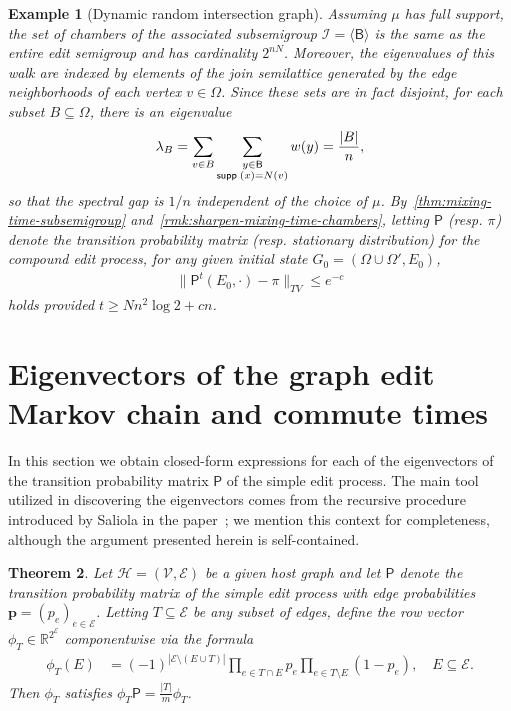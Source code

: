 \documentclass[11pt,a4paper]{article}
\newcommand{\supp}{{\mathsf{supp }\hspace{.075cm}}}
\newtheorem{theorem}{Theorem}[section]
\newtheorem{example}[theorem]{Example}
\begin{document}
\begin{example}[Dynamic random intersection graph]
    Assuming $\mu$ has full support, the set of chambers of the associated subsemigroup $\mathcal{I} = \langle \mathsf{B}\rangle$ is the same as the entire edit semigroup and has cardinality $2^{nN}$. Moreover, the eigenvalues of this walk are indexed by elements of the join semilattice generated by the edge neighborhoods of each vertex $v\in\Omega$. Since these sets are in fact disjoint, for each subset $B\subseteq \Omega$, there is an eigenvalue
        \begin{align*}
            \lambda_B = \sum_{v\in B} \sum_{\substack{y\in\mathsf{B} \\ \supp(x) = N(v)}} w(y) = \frac{|B|}{n},
        \end{align*}
    so that the spectral gap is $1/n$ independent of the choice of $\mu$. By~\cref{thm:mixing-time-subsemigroup} and~\cref{rmk:sharpen-mixing-time-chambers}, letting $\mathsf{P}$ (resp. $\pi$) denote the transition probability matrix (resp. stationary distribution) for the compound edit process, for any given initial state $G_0 = (\Omega\cup\Omega', E_0)$,
        \begin{align*}
            \|\mathsf{P}^t(E_0, \cdot) - \pi\|_{TV}\leq e^{-c}
        \end{align*}
    holds provided $t\geq Nn^2\log{2} + cn$.
\end{example}

\section{Eigenvectors of the graph edit Markov chain and commute times}\label{sec:eigenvectors}

In this section we obtain closed-form expressions for each of the eigenvectors of the transition probability matrix $\mathsf{P}$ of the simple edit process. The main tool utilized in discovering the eigenvectors comes from the recursive procedure introduced by Saliola in the paper~\cite{saliola2012eigenvectors}; we mention this context for completeness, although the argument presented herein is self-contained. 

\begin{theorem}\label{thm:eigenvectors}
    Let $\mathcal{H}=(\mathcal{V}, \mathcal{E})$ be a given host graph and let $\mathsf{P}$ denote the transition probability matrix of the simple edit process with edge probabilities $\mathbf{p} = (p_e)_{e\in\mathcal{E}}$. Letting $T\subseteq\mathcal{E}$ be any subset of edges, define the row vector $\phi_T\in\mathbb{R}^{2^\mathcal{E}}$ componentwise via the formula
        \begin{align}\label{eq:eigenvector-defn}
            \phi_T(E) &= (-1)^{|\mathcal{E}\setminus(E\cup T)|}\prod_{e\in T\cap E}p_e \prod_{e\in T\setminus E}(1-p_e),\quad E\subseteq \mathcal{E}.
        \end{align}
    Then $\phi_T$ satisfies $\phi_T \mathsf{P} = \frac{|T|}{m}\phi_T$.
\end{theorem}
\end{document}
